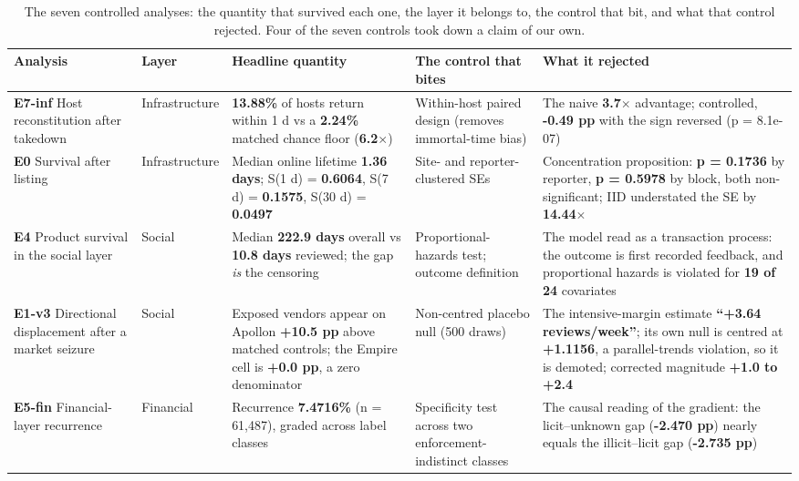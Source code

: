 \begin{table}[t]
\caption{The seven controlled analyses: the quantity that survived each one, the
layer it belongs to, the control that bit, and what that control rejected. Four
of the seven controls took down a claim of our own.\label{tab:analyses}}
\scriptsize
\setlength{\tabcolsep}{3pt}
\begin{tabular}{@{}L{1.75cm}L{1.55cm}L{4.35cm}L{3.35cm}L{5.0cm}@{}}
\toprule
\textbf{Analysis} & \textbf{Layer} & \textbf{Headline quantity} & \textbf{The control that bites} & \textbf{What it rejected}\\
\midrule
\textbf{E7-inf} Host reconstitution after takedown & Infrastructure & \textbf{13.88\%} of hosts return within 1 d vs a \textbf{2.24\%} matched chance floor (\textbf{6.2$\times$}) & Within-host paired design (removes immortal-time bias) & The naive \textbf{3.7$\times$} advantage; controlled, \textbf{-0.49 pp} with the sign reversed (p = 8.1e-07)\\
\textbf{E0} Survival after listing & Infrastructure & Median online lifetime \textbf{1.36 days}; S(1 d) = \textbf{0.6064}, S(7 d) = \textbf{0.1575}, S(30 d) = \textbf{0.0497} & Site- and reporter-clustered SEs & Concentration proposition: \textbf{p = 0.1736} by reporter, \textbf{p = 0.5978} by block, both non-significant; IID understated the SE by \textbf{14.44$\times$}\\
\textbf{E4} Product survival in the social layer & Social & Median \textbf{222.9 days} overall vs \textbf{10.8 days} reviewed; the gap \emph{is} the censoring & Proportional-hazards test; outcome definition & The model read as a transaction process: the outcome is first recorded feedback, and proportional hazards is violated for \textbf{19 of 24} covariates\\
\textbf{E1-v3} Directional displacement after a market seizure & Social & Exposed vendors appear on Apollon \textbf{+10.5 pp} above matched controls; the Empire cell is \textbf{+0.0 pp}, a zero denominator & Non-centred placebo null (500 draws) & The intensive-margin estimate \textbf{``+3.64 reviews/week''}; its own null is centred at \textbf{+1.1156}, a parallel-trends violation, so it is demoted; corrected magnitude \textbf{+1.0 to +2.4}\\
\textbf{E5-fin} Financial-layer recurrence & Financial & Recurrence \textbf{7.4716\%} (n = 61,487), graded across label classes & Specificity test across two enforcement-indistinct classes & The causal reading of the gradient: the licit--unknown gap (\textbf{-2.470 pp}) nearly equals the illicit--licit gap (\textbf{-2.735 pp})\\

\end{tabular}
\end{table}
